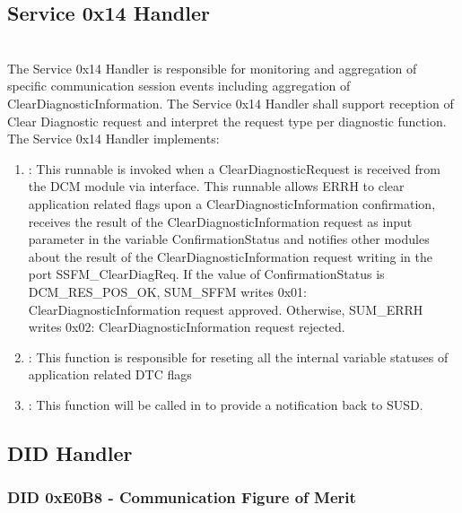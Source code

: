 \subsection{Service 0x14 Handler}
\\
The Service 0x14 Handler is responsible for monitoring and aggregation of specific communication session events including aggregation of ClearDiagnosticInformation. The Service 0x14 Handler shall support reception of Clear Diagnostic request and interpret the request type per diagnostic function. 
The Service 0x14 Handler implements:
\begin{enumerate}
    \item {}: This runnable is invoked when a ClearDiagnosticRequest is received from the DCM module via  interface. This runnable allows ERRH to clear application related flags upon a ClearDiagnosticInformation confirmation, receives the result of the ClearDiagnosticInformation request as input parameter in the variable ConfirmationStatus and notifies other modules about the result of the ClearDiagnosticInformation request writing in the port SSFM_ClearDiagReq. If the value of ConfirmationStatus is DCM_RES_POS_OK, SUM_SFFM writes 0x01: ClearDiagnosticInformation request approved. Otherwise, SUM_ERRH writes 0x02: ClearDiagnosticInformation request rejected.
    \item {}: This function is responsible for reseting all the internal variable statuses of application related DTC flags
    \item {}: This function will be called in  to  provide a notification back to SUSD.
\end{enumerate} 

{        }

\subsection{DID Handler}
\subsubsection{DID 0xE0B8 - Communication Figure of Merit}

